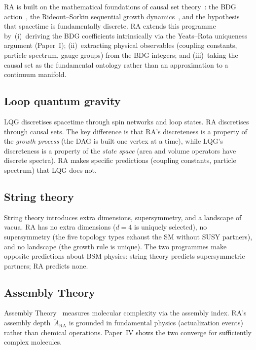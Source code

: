 \documentclass[11pt,a4paper]{article}
\theoremstyle{plain}
\theoremstyle{definition}
\theoremstyle{remark}
\begin{document}
RA is built on the mathematical foundations of causal set
theory~\cite{BLMS1987,Sorkin2005}: the BDG action~\cite{BenincasaDowker2010},
the Rideout--Sorkin sequential growth dynamics~\cite{RideoutSorkin2000}, and the
hypothesis that spacetime is fundamentally discrete.  RA extends this programme
by~(i)~deriving the BDG coefficients intrinsically via the Yeats--Rota
uniqueness argument (Paper~I); (ii)~extracting physical observables (coupling
constants, particle spectrum, gauge groups) from the BDG integers; and
(iii)~taking the causal set as the fundamental ontology rather than an
approximation to a continuum manifold.

\subsection{Loop quantum gravity}\label{sec:lqg}

LQG discretises spacetime through spin networks and loop states.  RA discretises
through causal sets.  The key difference is that RA's discreteness is a property
of the \emph{growth process} (the DAG is built one vertex at a time), while
LQG's discreteness is a property of the \emph{state space} (area and volume
operators have discrete spectra).  RA makes specific predictions (coupling
constants, particle spectrum) that LQG does not.

\subsection{String theory}\label{sec:strings}

String theory introduces extra dimensions, supersymmetry, and a landscape of
vacua.  RA has no extra dimensions ($d = 4$ is uniquely selected), no
supersymmetry (the five topology types exhaust the SM without SUSY partners),
and no landscape (the growth rule is unique).  The two programmes make opposite
predictions about BSM physics: string theory predicts supersymmetric partners;
RA predicts none.

\subsection{Assembly Theory}\label{sec:at}

Assembly Theory~\cite{Sharma2023} measures molecular complexity via the assembly
index.  RA's assembly depth~$\tilde{A}_{\mathrm{RA}}$ is grounded in
fundamental physics (actualization events) rather than chemical operations.
Paper~IV shows the two converge for sufficiently complex molecules.
\end{document}
